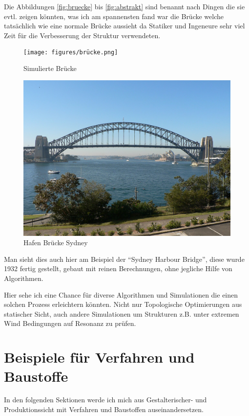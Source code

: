 \documentclass{article}
\begin{document}
Die Abbildungen \ref{fig:bruecke} bis \ref{fig:abstrakt} sind benannt nach
Dingen die sie evtl. zeigen k\"onnten, was ich am spannensten fand war die
Br\"ucke welche tats\"achlich wie eine normale Br\"ucke aussieht da Statiker 
und Ingeneure sehr viel Zeit f\"ur die Verbesserung der Struktur verwendeten.

\begin{figure}[H]
    \begin{minipage}{0.4\textwidth}
        \centering
        \texttt{[image: figures/brücke.png]}
        \caption{Simulierte Br\"ucke}
    \end{minipage}\hfill
    \begin{minipage}{0.4\textwidth}
        \centering
        \includegraphics[width=\linewidth]{figures/Sydney-Harbour_bridge.JPG}
        \caption{Hafen Br\"ucke Sydney\parencite{rabich2023}}
    \end{minipage}
\end{figure}

Man sieht dies auch hier am Beispiel der ``Sydney Harbour Bridge'', diese wurde 
1932 fertig gestellt, gebaut mit reinen Berechnungen, ohne jegliche Hilfe von Algorithmen. 

Hier sehe ich eine Chance f\"ur diverse Algorithmen und Simulationen die einen
solchen Prozess erleichtern k\"onnten. Nicht nur Topologische Optimierungen aus
statischer Sicht, auch andere Simulationen um Strukturen z.B. unter extremen Wind 
Bedingungen auf Resonanz zu pr\"ufen.


\section{Beispiele f\"ur Verfahren und Baustoffe}
In den folgenden Sektionen werde ich mich aus Gestalterischer- und Produktionssicht mit
Verfahren und Baustoffen auseinandersetzen.
\end{document}
